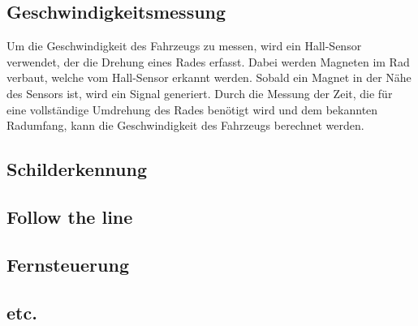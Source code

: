 
    \subsection{Geschwindigkeitsmessung}
    Um die Geschwindigkeit des Fahrzeugs zu messen, wird ein Hall-Sensor verwendet, der die Drehung eines Rades erfasst. Dabei werden Magneten im Rad verbaut, welche vom Hall-Sensor erkannt werden. Sobald ein Magnet in der Nähe des Sensors ist, wird ein Signal generiert. Durch die Messung der Zeit, die für eine vollständige Umdrehung des Rades benötigt wird und dem bekannten Radumfang, kann die Geschwindigkeit des Fahrzeugs berechnet werden. \\

    \subsection{Schilderkennung}
    \subsection{Follow the line}
    \subsection{Fernsteuerung}
    \subsection{etc.}
